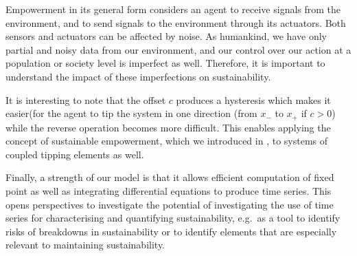 \documentclass[letterpaper]{article}
\begin{document}
Empowerment in its general form considers an agent to receive signals
from the environment, and to send signals to the environment through
its actuators. Both sensors and actuators can be affected by noise. As
humankind, we have only partial and noisy data from our environment,
and our control over our action at a population or society level is
imperfect as well. Therefore, it is important to understand the impact
of these imperfections on sustainability.



It is interesting to note that the offset $c$ produces a hysteresis
which makes it easier(for the agent to tip the system in one direction
(from $x_{-}$ to $x_{+}$ if $c > 0$) while the reverse operation
becomes more difficult. This enables applying the concept of
sustainable empowerment, which we introduced in
\citet{Kim2009_sustainability}, to systems of coupled tipping elements
as well.

Finally, a strength of our model is that it allows efficient
computation of fixed point as well as integrating differential
equations to produce time series. This opens perspectives to
investigate the potential of investigating the use of time series for
characterising and quantifying sustainability, e.g.\ as a tool to
identify risks of breakdowns in sustainability or to identify elements
that are especially relevant to maintaining sustainability.



\end{document}

